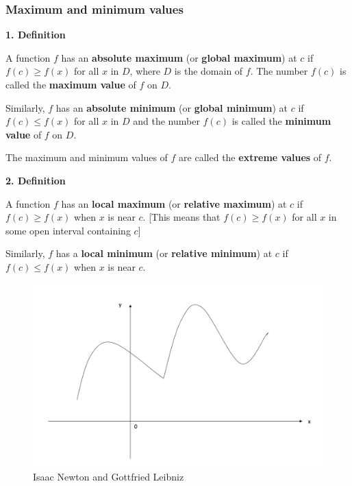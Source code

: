 \documentclass[]{book}
\begin{document}
\hypertarget{maximum-and-minimum-values}{%
\subsubsection{Maximum and minimum values}\label{maximum-and-minimum-values}}

\textbf{1. Definition}

A function \(f\) has an \textbf{absolute maximum} (or \textbf{global maximum}) at \(c\) if \(f(c)\geq f(x)\) for all \(x\) in \(D\), where \(D\) is the domain of \(f\). The number \(f(c)\) is called the \textbf{maximum value} of \(f\) on \(D\).

Similarly, \(f\) has an \textbf{absolute minimum} (or \textbf{global minimum}) at \(c\) if \(f(c)\leq f(x)\) for all \(x\) in \(D\) and the number \(f(c)\) is called the \textbf{minimum value} of \(f\) on \(D\).

The maximum and minimum values of \(f\) are called the \textbf{extreme values} of \(f\).

\textbf{2. Definition}

A function \(f\) has an \textbf{local maximum} (or \textbf{relative maximum}) at \(c\) if \(f(c)\geq f(x)\) when \(x\) is near \(c\).
{[}This means that \(f(c)\geq f(x)\) for all \(x\) in some open interval containing \(c\){]}

Similarly, \(f\) has a \textbf{local minimum} (or \textbf{relative minimum}) at \(c\) if \(f(c)\leq f(x)\) when \(x\) is near \(c\).

\begin{figure}

{\centering \includegraphics[width=1\linewidth]{figure/5Derivatives-14} 

}

\caption{Isaac Newton and Gottfried Leibniz}\label{fig:unnamed-chunk-18}
\end{figure}
\end{document}
